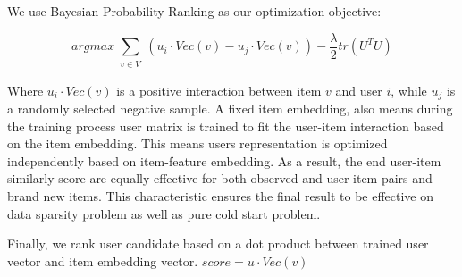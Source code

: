 We use Bayesian Probability Ranking as our optimization objective:

\begin{equation}
    arg max
    \sum\limits_{\substack{v \in V}}
    (u_i \cdot Vec(v)-u_j \cdot Vec(v)) - \dfrac{\lambda}{2}tr(U^TU)
\end{equation}

Where $u_i \cdot Vec(v)$ is a positive interaction between item $v$ and user $i$, while $u_j$ is a randomly selected negative sample.
A fixed item embedding, also means during the training process user matrix is trained to fit the user-item interaction based on the item embedding. 
This means users representation is optimized independently based on item-feature embedding. As a result, the end user-item similarly score are equally effective for both observed and user-item pairs and brand new items. This characteristic ensures the final result to be effective on data sparsity problem as well as pure cold start problem.

Finally, we rank user candidate based on a dot product between trained user vector and item embedding vector. $ score = u \cdot Vec(v)$



